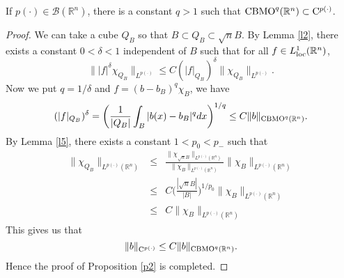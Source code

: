\documentclass{amse-new}
\numberwithin{equation}{section} %
\begin{document}
\begin{proposition}\label{p2}
If $p(\cdot)\in \mathcal{B}(\mathbb{R}^n)$, there is a constant $q>1$ such that ${\rm CBMO}^{q}(\mathbb{R}^n)\subset{\rm C}^{p(\cdot)}$.
\end{proposition}
\begin{proof}
We can take a cube $Q_{B}$ so that $B\subset Q_{B}\subset \sqrt{n}B$. By Lemma \ref{l2}, there exists a constant $0<\delta<1$ independent of $B$ such that for all $f\in L^{1}_{\rm loc}(\mathbb{R}^n)$,
$$\Big\||f|^{\delta}\chi_{Q_{B}}\Big\|_{L^{p(\cdot)}}\leq C(|f|_{Q_{B}})^{\delta}\|\chi_{Q_{B}}\|_{L^{p(\cdot)}}.$$
Now we put $q=1/\delta$ and $f=(b-b_{B})^{q}\chi_{B}$, we have
$$(|f|_{Q_{B}})^{\delta}=\bigg(\frac{1}{|Q_{B}|}\int_{B}|b(x)-b_{B}|^{q}dx\bigg)^{1/q}\leq C\|b\|_{{\rm CBMO}^{q}(\mathbb{R}^n)}.$$
By Lemma \ref{l5}, there exists a constant $1<p_{0}<p_{-}$ such that
\begin{eqnarray*}
\|\chi_{Q_{B}}\|_{L^{p(\cdot)}(\mathbb{R}^n)}
&\leq&\frac{\|\chi_{\sqrt{n}B}\|_{L^{p(\cdot)}(\mathbb{R}^n)}}{\|\chi_{B}\|_{L^{p(\cdot)}(\mathbb{R}^n)}}\|\chi_{B}\|_{L^{p(\cdot)}(\mathbb{R}^n)}\\
&\leq&C\bigg(\frac{|\sqrt{n}B|}{|B|}\bigg)^{1/p_{0}}\|\chi_{B}\|_{L^{p(\cdot)}(\mathbb{R}^n)}\\
&\leq&C\|\chi_{B}\|_{L^{p(\cdot)}(\mathbb{R}^n)}
\end{eqnarray*}
This gives us that
$$\|b\|_{{\rm C}^{p(\cdot)}}\leq C\|b\|_{{\rm CBMO}^{q}(\mathbb{R}^n)}.$$
Hence the proof of Proposition \ref{p2} is completed.
\end{proof}
\vspace{0.3cm}
\end{document}
